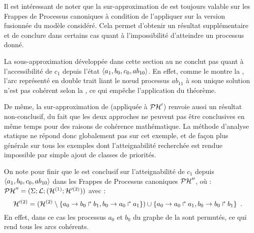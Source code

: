 \begin{remark}
  Il est intéressant de noter que la sur-approximation de 
  est toujours valable sur les Frappes de Processus canoniques à condition de l'appliquer
  sur la version fusionnée du modèle considéré.
  Cela permet d'obtenir un résultat supplémentaire et de conclure
  dans certains cas quant à l'impossibilité d'atteindre un processus donné.
\end{remark}



\begin{example}
  La sous-approximation développée dans cette section au 
  ne conclut pas quant à l'accessibilité de $c_1$ depuis l'état
  $\mbox{$\langle a_1, b_0, c_0, ab_{10} \rangle$}$.
  En effet, comme le montre la ,
  l'arc représenté en double trait liant le nœud processus $ab_{11}$ à son unique solution
  n'est pas cohérent selon la
  , ce qui empêche l'application du théorème.
  
  De même, la sur-approximation de  (appliquée à $\mathcal{PH}'$)
  renvoie aussi un résultat non-conclusif,
  du fait que les deux approches ne peuvent pas être conclusives en même temps
  pour des raisons de cohérence mathématique.
  La méthode d'analyse statique ne répond donc globalement pas sur cet exemple,
  et de façon plus générale sur tous les exemples dont l'atteignabilité recherchée
  est rendue impossible par simple ajout de classes de priorités.
  
  On note pour finir que le  est conclusif sur l'atteignabilité de $c_1$
  depuis $\mbox{$\langle a_1, b_0, c_0, ab_{10} \rangle$}$ dans les Frappes de Processus canoniques $\mathcal{PH}''$, où :
  $\mathcal{PH}'' = (\Sigma; \mathcal{L}; (\mathcal{H}^{(1)};\mathcal{H}'^{(2)}))$ avec :
  \[\mathcal{H}'^{(2)} = (\mathcal{H}^{(2)} \setminus \{ a_0\rightarrow b_0\Rsh b_1, b_0\rightarrow a_0\Rsh a_1 \})
    \cup \{ a_0\rightarrow a_0\Rsh a_1, b_0\rightarrow b_0\Rsh b_1 \} \enspace.\]
  En effet, dans ce cas les processus $a_0$ et $b_0$ du graphe de la 
  sont permutés, ce qui rend tous les arcs cohérents.
  
  \begin{figure}[tp]
    \centering
\end{figure}
\end{example}
